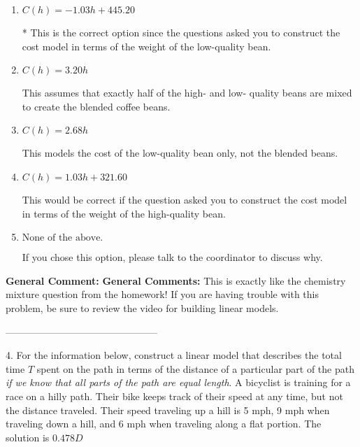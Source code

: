\documentclass{extbook}[14pt]
\begin{document}
\begin{enumerate}[label=\Alph*.] 
\item $ C(h) = -1.03 h + 445.20 $ 

 * This is the correct option since the questions asked you to construct the cost model in terms of the weight of the low-quality bean. 
\item $ C(h) = 3.20 h $ 

 This assumes that exactly half of the high- and low- quality beans are mixed to create the blended coffee beans. 
\item $ C(h) = 2.68 h $ 

 This models the cost of the low-quality bean only, not the blended beans. 
\item $ C(h) = 1.03 h + 321.60 $ 

 This would be correct if the question asked you to construct the cost model in terms of the weight of the high-quality bean. 
\item $ \text{None of the above.} $ 

 If you chose this option, please talk to the coordinator to discuss why. 
\end{enumerate} 
 
\textbf{General Comment:} \textbf{General Comments:} This is exactly like the chemistry mixture question from the homework! If you are having trouble with this problem, be sure to review the video for building linear models. 

-----------------------------------------------

4. For the information below, construct a linear model that describes the total time $T$ spent on the path in terms of the distance of a particular part of the path \textit{if we know that all parts of the path are equal length}.
A bicyclist is training for a race on a hilly path. Their bike keeps track of their speed at any time, but not the distance traveled. Their speed traveling up a hill is 5 mph, 9 mph when traveling down a hill, and 6 mph when traveling along a flat portion. 
The solution is $ 0.478 D $ 
\end{document}
